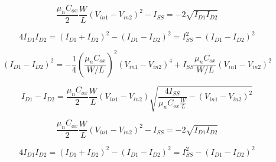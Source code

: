 \noindent
\begin{equation}
\frac{\mu_n C_{ox}}{2} \frac{W}{L} (V_{in1} - V_{in2})^2 - I_{SS} = -2 \sqrt{I_{D1} I_{D2}}
\end{equation}

\vspace{0.25cm}

\noindent
\begin{equation}
4 I_{D1} I_{D2} = (I_{D1} + I_{D2})^2 - (I_{D1} - I_{D2})^2 = I_{SS}^2 - (I_{D1} - I_{D2})^2
\end{equation}

\vspace{0.25cm}

\noindent
\begin{equation}
(I_{D1} - I_{D2})^2 = -\frac{1}{4} \left( \frac{\mu_n C_{ox}}{W/L} \right)^2 (V_{in1} - V_{in2})^4 
+ I_{SS} \frac{\mu_n C_{ox}}{W/L} (V_{in1} - V_{in2})^2
\end{equation}

\vspace{0.25cm}

\begin{equation}
I_{D1} - I_{D2} = \frac{\mu_n C_{ox}}{2} \frac{W}{L}(V_{in1} - V_{in2}) 
\sqrt{\frac{4 I_{SS}}{\mu_n C_{ox} \frac{W}{L}} - (V_{in1} - V_{in2})^2}
\end{equation}

\vspace{0.25cm}

\noindent
\begin{equation}
\frac{\mu_n C_{ox}}{2} \frac{W}{L} (V_{in1} - V_{in2})^2 - I_{SS} = -2 \sqrt{I_{D1} I_{D2}}
\end{equation}

\vspace{0.25cm}

\noindent
\begin{equation}
4 I_{D1} I_{D2} = (I_{D1} + I_{D2})^2 - (I_{D1} - I_{D2})^2 = I_{SS}^2 - (I_{D1} - I_{D2})^2
\end{equation}

\vspace{0.25cm}

